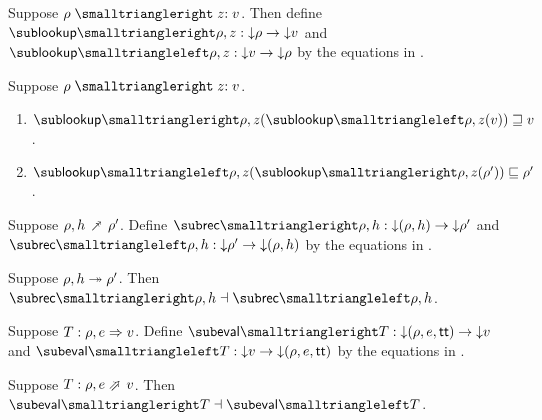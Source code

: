 \begin{definition}
   Suppose $\envLookup{\rho}{z}{v}$. Then define $\envLookupFwdF{\rho,z}: \Below{\rho} \to \Below{v}$ and $\envLookupBwdF{\rho,z}: \Below{v} \to \Below{\rho}$ by the equations in .
\end{definition}

\begin{lemma}
\label{lem:core-language:env-get-put}Suppose $\envLookup{\rho}{z}{v}$.
\begin{enumerate}
   \item \label{lem:core-language:env-get-put:1} $\envLookupFwdF{\rho,z}(\envLookupBwdF{\rho,z}(v)) \geq v$.
   \item \label{lem:core-language:env-get-put:2} $\envLookupBwdF{\rho,z}(\envLookupFwdF{\rho,z}(\rho')) \leq \rho'$.
\end{enumerate}
\end{lemma}

\begin{definition}
   Suppose $\rho, h \closeDefsFwdR \rho'$. Define $\closeDefsFwdF{\rho,h}: \Below{(\rho, h)} \to \Below{\rho'}$ and $\closeDefsBwdF{\rho,h}: \Below{\rho'} \to \Below{(\rho, h)}$ by the equations in .
\end{definition}

\begin{theorem}
\label{thm:core-language:closeDefs:gc}
   Suppose $\rho, h \mathrel{\twoheadrightarrow} \rho'$.  Then $\closeDefsFwdF{\rho,h} \adjoint \closeDefsBwdF{\rho,h}$.
\end{theorem}

\begin{definition}
   Suppose $T: \rho, e \mathrel{\Rightarrow} v$. Define $\evalFwdF{T}: \Below{(\rho, e, \TT)} \to \Below{v}$ and $\evalBwdF{T}: \Below{v} \to \Below{(\rho, e, \TT)}$ by the equations in .
\end{definition}

\begin{theorem}
\label{thm:core-language:eval:gc}
   Suppose $T: \rho, e \evalFwdS v$.  Then $\evalFwdF{T} \adjoint \evalBwdF{T}$.
\end{theorem}
